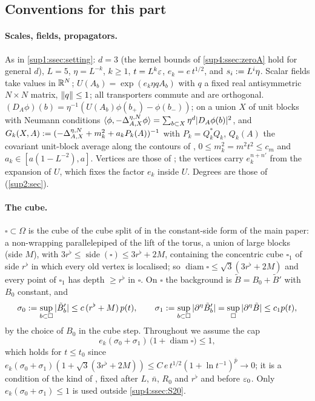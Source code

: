 \subsection*{Conventions for this part}

\paragraph{Scales, fields, propagators.} As in \cref{sup1:ssec:setting}: $d=3$ (the kernel bounds of \cref{sup4:ssec:zeroA} hold for general $d$), $L=5$, $\eta=L^{-k}$, $k\ge1$, $t=L^k\varepsilon$, $e_k=e\,t^{1/2}$, and $s_i:= L^i\eta$. Scalar fields take values in $\mathbb R^N$; $U(A_b)=\exp(e_k\eta qA_b)$ with $q$ a fixed real antisymmetric $N\times N$ matrix, $\lVert q\rVert\le1$; all transporters commute and are orthogonal. $(D_A\phi)(b)=\eta^{-1}(U(A_b)\phi(b_+)-\phi(b_-))$; on a union $X$ of unit blocks with Neumann conditions $\langle \phi,-\Delta^{\eta,N}_{A,X}\phi\rangle=\sum_{b\subset X}\eta^d|D_A\phi(b)|^2$, and $G_k(X,A):=(-\Delta^{\eta,N}_{A,X}+m_k^2+a_kP_k(A))^{-1}$ with $P_k=Q_k^*Q_k$, $Q_k(A)$ the covariant unit-block average along the contours of \cite[(2.1)--(2.2)]{Ba1}, $0\le m_k^2=m^2t^2\le c_m$ and $a_k\in[a(1-L^{-2}),a]$. Vertices are those of \cite[(1.6)--(1.15)]{Ba3}; the vertices \cite[(1.8)--(1.11)]{Ba3} carry $e_k^{n+n'}$ from the expansion of $U$, which fixes the factor $e_k$ inside $U$. Degrees are those of \cite[(2.1)--(2.3)]{Ba3} (\cref{sup2:sec}).

\paragraph{The cube.} $\square\subset\Omega$ is the cube of the cube split of \cite[p.~433]{Ba3} in the constant-side form of the main paper: a non-wrapping parallelepiped of the lift of the torus, a union of large blocks (side $M$), with $3r^\flat\le\operatorname{side}(\square)\le3r^\flat+2M$, containing the concentric cube $\square_1$ of side $r^\flat$ in which every old vertex is localised; so $\operatorname{diam}\square\le\sqrt3(3r^\flat+2M)$ and every point of $\square_1$ has depth $\ge r^\flat$ in $\square$. On $\square$ the background is $\tilde B=B_0+\tilde B'$ with $B_0$ constant, and
\[
\sigma_0:=\sup_{b\subset\square}|\tilde B'_b|\le c\,(r^\flat+M)\,p(t),\qquad \sigma_1:=\sup_{b\subset\square}|\partial^\eta\tilde B'_b|=\sup_\square|\partial^\eta\tilde B|\le c_1p(t),
\]
by the choice of $B_0$ in the cube step. Throughout we assume the cap
\begin{equation}\label{sup4:eq:cap}
e_k(\sigma_0+\sigma_1)\,\big(1+\operatorname{diam}\square\big)\le1,\tag{cap}
\end{equation}
which holds for $t\le t_0$ since $e_k(\sigma_0+\sigma_1)(1+\sqrt3(3r^\flat+2M))\le C\,e\,t^{1/2}(1+\ln t^{-1})^{\bar p}\to0$; it is a condition of the kind of \cite[p.~412]{Ba3}, fixed after $L$, $\bar n$, $R_0$ and $r^\flat$ and before $\varepsilon_0$. Only $e_k(\sigma_0+\sigma_1)\le1$ is used outside \cref{sup4:ssec:S20}.


